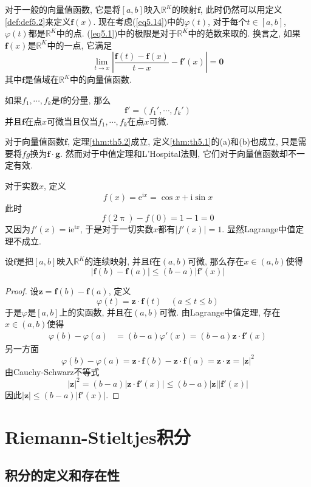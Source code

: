 \documentclass[cn,12pt,math=mtpro2,citestyle=gb7714-2015,bibstyle=gb7714-2015,twocol]{elegantbook}
\newcommand{\R}{\mathbb{R}}
\newcommand{\f}{\mathbold{f}}
\newcommand{\g}{\mathbold{g}}
\begin{document}
对于一般的向量值函数, 它是将$[a,b]$映入$\R^K$的映射$\f $, 此时仍然可以用定义\ref{def:def5.2}来定义$\f (x)$. 现在考虑(\ref{eq5.14})中的$\varphi(t)$, 对于每个$t\in [a,b]$, $\varphi(t)$都是$\R^K$中的点. (\ref{eq5.1})中的极限是对于$\R^K$中的范数来取的. 换言之, 如果$\f (x)$是$\R^K$中的一点, 它满足
$$\lim_{t\to x}\left|\frac{\f (t)-\f (x)}{t-x}-\f '(x) \right|=\mathbold{0}$$
其中$\f $是值域在$\R^K$中的向量值函数.

如果$f_1,\cdots,f_k$是$\f $的分量, 那么
$$\f '=(f_1',\cdots,f_k')$$
并且$\f $在点$x$可微当且仅当$f_1,\cdots,f_k$在点$x$可微.

对于向量值函数$\f $, 定理\ref{thm:th5.2}成立, 定义\ref{thm:th5.1}的(a)和(b)也成立, 只是需要将$fg$换为$\f \cdot\g $. 然而对于中值定理和L'Hospital法则, 它们对于向量值函数却不一定有效.
\begin{example}
对于实数$x$, 定义
$$f(x)=\text{e}^{\text{i}x}=\cos x+\text{i}\sin x$$
此时
$$f(2\uppi)-f(0)=1-1=0$$
又因为$f'(x)=\text{i}\text{e}^{\text{i}x}$, 于是对于一切实数$x$都有$|f'(x)|=1$. 显然Lagrange中值定理不成立.
\end{example}

\begin{theorem}\label{thm:th5.3}
  设$\f $是把$[a,b]$映入$\R^K$的连续映射, 并且$\f $在$(a,b)$可微, 那么存在$x\in(a,b)$使得
  $$|\f (b)-\f (a)|\leq(b-a)|\f '(x)|$$
\end{theorem}
\begin{proof}
  设$\mathbold{z}=\f (b)-\f (a)$, 定义
  $$\varphi(t)=\mathbold{z}\cdot\f (t)\quad (a\leq t \leq b)$$
  于是$\varphi$是$[a,b]$上的实函数, 并且在$(a,b)$可微. 由Lagrange中值定理, 存在$x\in(a,b)$使得
  \begin{align*}
  \varphi(b)-\varphi(a)&=(b-a)\varphi'(x)=(b-a)\mathbold{z}\cdot\f '(x)
  \end{align*}
  另一方面
  $$\varphi(b)-\varphi(a)=\mathbold{z}\cdot\f (b)-\mathbold{z}\cdot\f (a)=\mathbold{z}\cdot\mathbold{z}=|\mathbold{z}|^2$$
  由Cauchy-Schwarz不等式
  $$|\mathbold{z}|^2=(b-a)|\mathbold{z}\cdot\f '(x)|\leq(b-a)|\mathbold{z}||\mathbold{f'}(x)|$$
  因此$|\mathbold{z}|\leq(b-a)|\f '(x)|$.


\end{proof}
\chapter{Riemann-Stieltjes积分}
\section{积分的定义和存在性}
\end{document}
